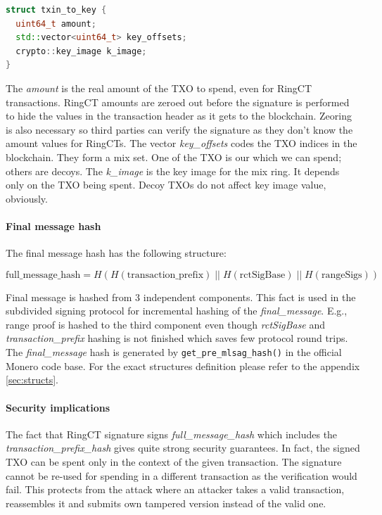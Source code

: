 \documentclass[]{article}
\begin{document}
\begin{lstlisting}[language=c++]
struct txin_to_key {
  uint64_t amount;
  std::vector<uint64_t> key_offsets;
  crypto::key_image k_image;
}
\end{lstlisting}

The \emph{amount} is the real amount of the TXO to spend, even for RingCT transactions. RingCT amounts are zeroed out before the signature is performed to hide the values in the transaction header as it gets to the blockchain. Zeoring is also necessary so third parties can verify the signature as they don't know the amount values for RingCTs.
The vector \emph{key\_offsets} codes the TXO indices in the blockchain. They form a mix set. One of the TXO is our which we can spend; others are decoys.
The \emph{k\_image} is the key image for the mix ring. It depends only on the TXO being spent. Decoy TXOs do not affect key image value, obviously.

\paragraph{Final message hash} The final message hash has the following structure:
	
\begin{equation}  \label{eq:full_message_hash}
\text{full\_message\_hash} = H(H(\text{transaction\_prefix}) \; || \; H(\text{rctSigBase}) \; || \; H(\text{rangeSigs}))
\end{equation}

Final message is hashed from 3 independent components. This fact is used in the subdivided signing protocol for incremental hashing of the \emph{final\_message}. E.g., range proof is hashed to the third component even though \emph{rctSigBase} and \emph{transaction\_prefix} hashing is not finished which saves few protocol round trips.
The \emph{final\_message} hash is generated by \verb|get_pre_mlsag_hash()| in the official Monero code base.
For the exact structures definition please refer to the appendix \ref{sec:structs}.

\paragraph{Security implications}
The fact that RingCT signature signs \emph{full\_message\_hash} which includes the \emph{transaction\_prefix\_hash} gives quite strong security guarantees. In fact, the signed TXO can be spent only in the context of the given transaction. The signature cannot be re-used for spending in a different transaction as the verification would fail. This protects from the attack where an attacker takes a valid transaction, reassembles it and submits own tampered version instead of the valid one.
\end{document}
